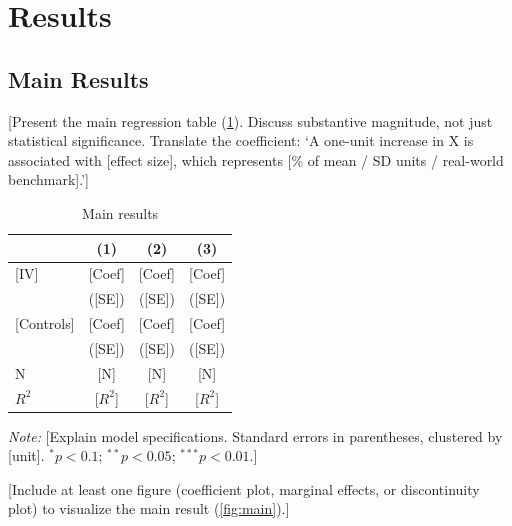 \documentclass[12pt,a4paper]{article}
\begin{document}
\section{Results}\label{sec:results} %

\subsection{Main Results} %
[Present the main regression table (\cref{tab:results}). Discuss substantive magnitude, not just statistical significance. Translate the coefficient: `A one-unit increase in X is associated with [effect size], which represents [\% of mean / SD units / real-world benchmark].']

\begin{table}[htbp]
    \centering
    \begin{threeparttable}
        \caption{Main results}
        \label{tab:results}
        \begin{tabular}{l*{3}{c}}
            \toprule
             & (1) & (2) & (3) \\
            \midrule
            {[IV]}       & [Coef] & [Coef] & [Coef] \\
                         & ([SE]) & ([SE]) & ([SE]) \\
            {[Controls]} & [Coef] & [Coef] & [Coef] \\
                         & ([SE]) & ([SE]) & ([SE]) \\
            \midrule
            N            & [N]    & [N]    & [N]    \\
            $R^2$        & [$R^2$] & [$R^2$] & [$R^2$] \\
            \bottomrule
        \end{tabular}
        \begin{tablenotes}[flushleft]
            \footnotesize
            \item \textit{Note:} [Explain model specifications. Standard errors in parentheses, clustered by [unit]. $^{*}p<0.1$; $^{**}p<0.05$; $^{***}p<0.01$.]
        \end{tablenotes}
    \end{threeparttable}
\end{table}

[Include at least one figure (coefficient plot, marginal effects, or discontinuity plot) to visualize the main result (\cref{fig:main}).]
\end{document}
